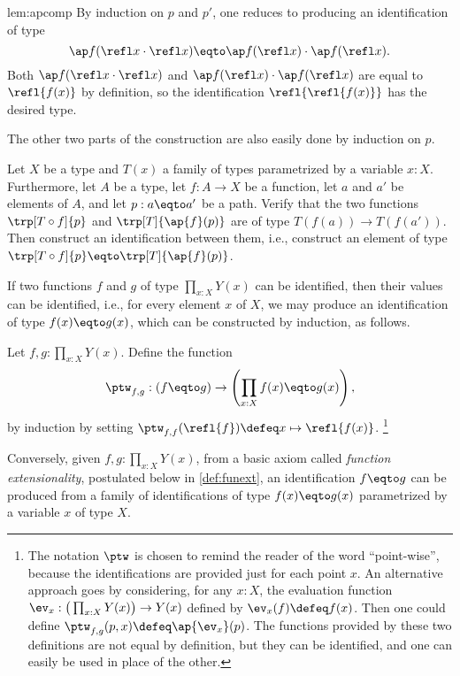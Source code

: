 \begin{implementation}{lem:apcomp}
  By induction on $p$ and $p'$, one reduces to producing an identification of type
  \[
    \ap f (\refl x \cdot \refl x) \eqto  \ap f ( \refl x ) \cdot  \ap f ( \refl x ).
  \]
  Both $\ap f (\refl x \cdot \refl x)$ and
  $\ap f ( \refl x ) \cdot  \ap f ( \refl x )$
  are equal to $\refl { f(x) }$ by definition,
  so the identification $\refl {\refl { f(x) }}$ has the desired type.

  The other two parts of the construction are also easily done by induction on $p$.
\end{implementation}

\begin{xca}\label{xca:trp-ap}
  Let $X$ be a type and $T(x)$ a family of types parametrized by a variable $x:X$. Furthermore, let $A$ be a type, let $f:A\to X$ be a
  function, let $a$ and $a'$ be elements of $A$, and let $p: a \eqto a'$ be a path.
  Verify that the two functions $\trp[T \circ f]{p}$ and $\trp[T]{\ap{f}(p)}$ are of type $T(f(a)) \to T(f(a'))$.
  Then construct an identification between them, i.e., construct an element of type $\trp[T \circ f]{p} \eqto \trp[T]{\ap{f}(p)}$.
\end{xca}

If two functions $f$ and $g$ of type $\prod_{x:X} Y(x)$ can be identified, then their values can be identified, i.e., for every element $x$ of
$X$, we may produce an identification of type $f(x) \eqto g(x)$, which can be constructed by induction, as follows.

\begin{definition}\label{def:ptw}
  Let $f,g:\prod_{x:X} Y(x)$. Define the function
  \[
    {\ptw}_{f,g}: ( f \eqto g ) \to \left( \prod_{x:X} f(x) \eqto g(x) \right),
  \]
  by induction by setting ${\ptw}_{f,f}(\refl{f}) \defeq x \mapsto \refl{f(x)}$.
  \footnote{The notation $\ptw$ is chosen to remind the reader of the word ``point-wise'', because the identifications are provided just for each
  point $x$.   An alternative approach goes by considering, for any $x:X$, the evaluation function $\ev_x : \big(\prod_{x:X} Y(x)\bigr) \to Y(x)$ defined by
    $\ev_x(f) \defeq f(x)$.  Then one could define ${\ptw}_{f,g}(p,x) \defeq \ap{\ev_x}(p)$.  The functions provided by these two definitions
  are not equal by definition, but they can be identified, and one can easily be used in place of the other.}
\end{definition}

Conversely, given $f,g:\prod_{x:X} Y(x)$,
from a basic axiom called \emph{function extensionality},%
postulated below in \cref{def:funext}, an identification $f \eqto g$
can be produced from a family of identifications of type $f(x) \eqto g(x)$
parametrized by a variable $x$ of type $X$.

